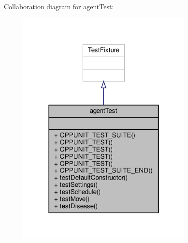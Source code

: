 Collaboration diagram for agent\+Test\+:\nopagebreak
\begin{figure}[H]
\begin{center}
\leavevmode
\includegraphics[width=250pt]{classagentTest__coll__graph}
\end{center}
\end{figure}
